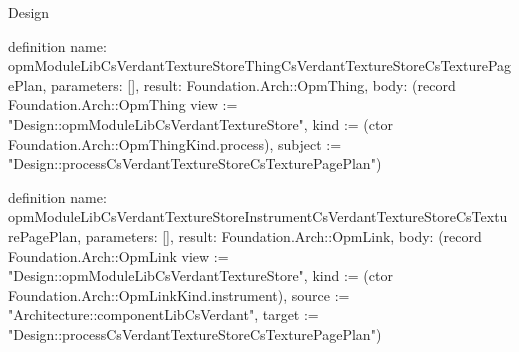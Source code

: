 \begin{lexlean}{Design}
\begin{semanticmodule}
definition{
  name: opmModuleLibCsVerdantTextureStoreThingCsVerdantTextureStoreCsTexturePagePlan,
  parameters: [],
  result: Foundation.Arch::OpmThing,
  body: (record Foundation.Arch::OpmThing {view := "Design::opmModuleLibCsVerdantTextureStore", kind := (ctor Foundation.Arch::OpmThingKind.process), subject := "Design::processCsVerdantTextureStoreCsTexturePagePlan"})
}

definition{
  name: opmModuleLibCsVerdantTextureStoreInstrumentCsVerdantTextureStoreCsTexturePagePlan,
  parameters: [],
  result: Foundation.Arch::OpmLink,
  body: (record Foundation.Arch::OpmLink {view := "Design::opmModuleLibCsVerdantTextureStore", kind := (ctor Foundation.Arch::OpmLinkKind.instrument), source := "Architecture::componentLibCsVerdant", target := "Design::processCsVerdantTextureStoreCsTexturePagePlan"})
}
\end{semanticmodule}
\end{lexlean}
